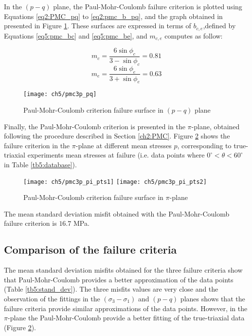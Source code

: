 In the $(p-q)$ plane, the Paul-Mohr-Coulomb failure criterion is plotted using Equations \ref{eq2:PMC_pq} to \ref{eq2:pmc_b_pq}, and the graph obtained in presented in Figure \ref{fig5:pmc_pq}. These surfaces are expressed in terms of $b_{c,e}$,defined by Equations \ref{eq5:pmc_bc} and \ref{eq5:pmc_be}, and $m_{c,e}$ computes as follow: 

\begin{equation}\label{eq5:pmc_mc}
    m_c=\frac{6 \sin \phi_{c}}{3-\sin \phi_{c}} = 0.81
\end{equation}
\begin{equation}\label{eq5:pmc_me}
    m_e=\frac{6 \sin \phi_{e}}{3+\sin \phi_{e}} = 0.63
\end{equation}

\begin{figure}[p]
    \centering
    \texttt{[image: ch5/pmc3p\_pq]}
    \caption{Paul-Mohr-Coulomb criterion failure surface in $(p-q)$ plane}
    \label{fig5:pmc_pq}
\end{figure} 

Finally, the Paul-Mohr-Coulomb criterion is presented in the $\pi$-plane, obtained following the procedure described in Section \ref{ch2:PMC}. Figure \ref{fig5:pmc_pi_plane} shows the failure criterion in the $\pi$-plane at different mean stresses $p$, corresponding to true-triaxial experiments mean stresses at failure (i.e. data points where $0^\circ < \theta < 60^\circ$ in Table \ref{tb5:database}).

\begin{figure}[tb]
    \centering
    \texttt{[image: ch5/pmc3p\_pi\_pts1]}
    \texttt{[image: ch5/pmc3p\_pi\_pts2]}
    \caption{Paul-Mohr-Coulomb criterion failure surface in  $\pi$-plane}
    \label{fig5:pmc_pi_plane}
\end{figure} 

The mean standard deviation misfit obtained with the Paul-Mohr-Coulomb failure criterion is $16.7$ \si{\mega\pascal}. 

\subsection{Comparison of the failure criteria}

The mean standard deviation misfits obtained for the three failure criteria show that Paul-Mohr-Coulomb provides a better approximation of the data points (Table \ref{tb5:stand_dev}). The three misfits values are very close and the observation of the fittings in the $(\sigma_3-\sigma_1)$ and $(p-q)$ planes shows that the failure criteria provide similar approximations of the data points. However, in the $\pi$-plane the Paul-Mohr-Coulomb provide a better fitting of the true-triaxial data (Figure \ref{fig5:pmc_pi_plane}).

